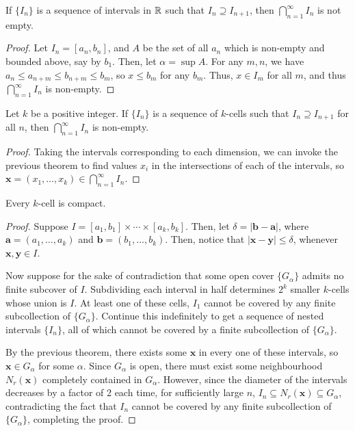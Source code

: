 \begin{theorem}
If $\{I_n\}$ is a sequence of intervals in $\mathbb{R}$ such that $I_n \supseteq I_{n+1}$, then $\bigcap_{n=1}^{\infty} I_n$ is not empty.

\begin{proof}
Let $I_n = [a_n, b_n]$, and $A$ be the set of all $a_n$ which is non-empty and bounded above, say by $b_1$. Then, let $\alpha = \sup A$. For any $m, n$, we have $a_n \le a_{n+m} \le b_{n+m} \le b_m$, so $x \le b_m$ for any $b_m$. Thus, $x \in I_m$ for all $m$, and thus $\bigcap_{n=1}^{\infty} I_n$ is non-empty.
\end{proof}
\end{theorem}

\begin{theorem}
Let $k$ be a positive integer. If $\{I_n\}$ is a sequence of $k$-cells such that $I_n \supseteq I_{n+1}$ for all $n$, then $\bigcap_{n=1}^{\infty} I_n$ is non-empty.

\begin{proof}
Taking the intervals corresponding to each dimension, we can invoke the previous theorem to find values $x_i$ in the intersections of each of the intervals, so $\textbf{x} = (x_1, \dotsc, x_k) \in \bigcap_{n=1}^{\infty} I_n$.
\end{proof}
\end{theorem}

\begin{theorem}
Every $k$-cell is compact.

\begin{proof}
Suppose $I = [a_1, b_1] \times \dotsb \times [a_k, b_k]$. Then, let $\delta = \left| \textbf{b} - \textbf{a} \right|$, where $\textbf{a} = (a_1, \dotsc, a_k)$ and $\textbf{b} = (b_1, \dotsc, b_k)$. Then, notice that $|\textbf{x} - \textbf{y}| \le \delta$, whenever $\textbf{x}, \textbf{y} \in I$. 

Now suppose for the sake of contradiction that some open cover $\{G_\alpha\}$ admits no finite subcover of $I$. Subdividing each interval in half determines $2^k$ smaller $k$-cells whose union is $I$. At least one of these cells, $I_1$ cannot be covered by any finite subcollection of $\{G_\alpha\}$. Continue this indefinitely to get a sequence of nested intervals $\{I_n\}$, all of which cannot be covered by a finite subcollection of $\{G_\alpha\}$. 

By the previous theorem, there exists some $\textbf{x}$ in every one of these intervals, so $\textbf{x} \in G_\alpha$ for some $\alpha$. Since $G_\alpha$ is open, there must exist some neighbourhood $N_r(\textbf{x})$ completely contained in $G_\alpha$. However, since the diameter of the intervals decreases by a factor of 2 each time, for sufficiently large $n$, $I_n \subseteq N_r(\textbf{x}) \subseteq G_\alpha$, contradicting the fact that $I_n$ cannot be covered by any finite subcollection of $\{G_\alpha\}$, completing the proof.
\end{proof}
\end{theorem}

